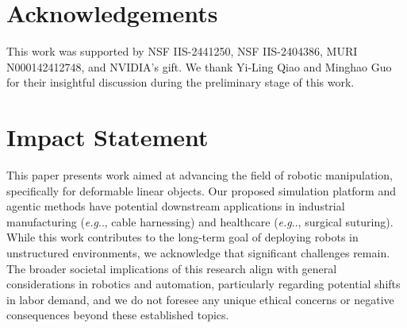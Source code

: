 \documentclass{article}
\makeatletter
\theoremstyle{plain}
\theoremstyle{definition}
\theoremstyle{remark}
\DeclareRobustCommand\onedot{\futurelet\@let@token\@onedot}
\def\@onedot{\ifx\@let@token.\else.\null\fi\xspace}
\def\eg{\emph{e.g}\onedot}
\makeatother
\begin{document}





\section*{Acknowledgements}
This work was supported by NSF IIS-2441250, NSF IIS-2404386, MURI N000142412748, and NVIDIA's gift. We thank Yi-Ling Qiao and Minghao Guo for their insightful discussion during the preliminary stage of this work.


\section*{Impact Statement}
This paper presents work aimed at advancing the field of robotic manipulation, specifically for deformable linear objects. Our proposed simulation platform and agentic methods have potential downstream applications in industrial manufacturing (\eg, cable harnessing) and healthcare (\eg, surgical suturing). While this work contributes to the long-term goal of deploying robots in unstructured environments, we acknowledge that significant challenges remain. The broader societal implications of this research align with general considerations in robotics and automation, particularly regarding potential shifts in labor demand, and we do not foresee any unique ethical concerns or negative consequences beyond these established topics.
\end{document}
